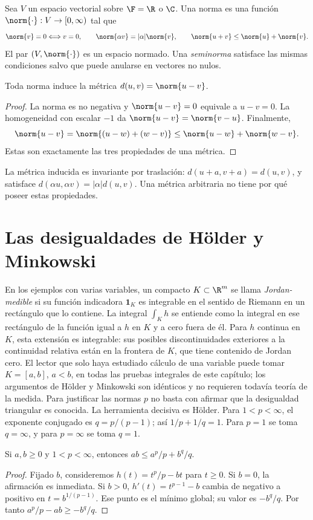 \begin{definicion}\label{ch01:norma}
Sea $V$ un espacio vectorial sobre $\F=\R$ o $\C$. Una norma es una función $\norm{\cdot}:V\to[0,\infty)$ tal que
\[
\norm{v}=0\Longleftrightarrow v=0,\qquad
\norm{\alpha v}=|\alpha|\norm{v},\qquad
\norm{u+v}\le\norm{u}+\norm{v}.
\]
El par $(V,\norm{\cdot})$ es un espacio normado. Una \emph{seminorma} satisface las mismas condiciones salvo que puede anularse en vectores no nulos.
\end{definicion}
\begin{proposicion}\label{ch01:inducida}
Toda norma induce la métrica $d(u,v)=\norm{u-v}$.
\end{proposicion}
\begin{proof}
La norma es no negativa y $\norm{u-v}=0$ equivale a $u-v=0$. La homogeneidad con escalar $-1$ da $\norm{u-v}=\norm{v-u}$. Finalmente,
\[
\norm{u-v}=\norm{(u-w)+(w-v)}\le\norm{u-w}+\norm{w-v}.
\]
Estas son exactamente las tres propiedades de una métrica.
\end{proof}
La métrica inducida es invariante por traslación: $d(u+a,v+a)=d(u,v)$, y satisface $d(\alpha u,\alpha v)=|\alpha|d(u,v)$. Una métrica arbitraria no tiene por qué poseer estas propiedades.

\section{Las desigualdades de Hölder y Minkowski}
En los ejemplos con varias variables, un compacto $K\subset\R^m$ se llama \emph{Jordan-medible} si su función indicadora $\mathbf1_K$ es integrable en el sentido de Riemann en un rectángulo que lo contiene. La integral $\int_K h$ se entiende como la integral en ese rectángulo de la función igual a $h$ en $K$ y a cero fuera de él. Para $h$ continua en $K$, esta extensión es integrable: sus posibles discontinuidades exteriores a la continuidad relativa están en la frontera de $K$, que tiene contenido de Jordan cero. El lector que solo haya estudiado cálculo de una variable puede tomar $K=[a,b]$, $a<b$, en todas las pruebas integrales de este capítulo; los argumentos de Hölder y Minkowski son idénticos y no requieren todavía teoría de la medida.
Para justificar las normas $p$ no basta con afirmar que la desigualdad triangular es conocida. La herramienta decisiva es Hölder. Para $1<p<\infty$, el exponente conjugado es $q=p/(p-1)$; así $1/p+1/q=1$. Para $p=1$ se toma $q=\infty$, y para $p=\infty$ se toma $q=1$.

\begin{lema}\label{ch01:young}
Si $a,b\ge0$ y $1<p<\infty$, entonces $ab\le a^p/p+b^q/q$.
\end{lema}
\begin{proof}
Fijado $b$, consideremos $h(t)=t^p/p-bt$ para $t\ge0$. Si $b=0$, la afirmación es inmediata. Si $b>0$, $h'(t)=t^{p-1}-b$ cambia de negativo a positivo en $t=b^{1/(p-1)}$. Ese punto es el mínimo global; su valor es $-b^q/q$. Por tanto $a^p/p-ab\ge-b^q/q$.
\end{proof}

